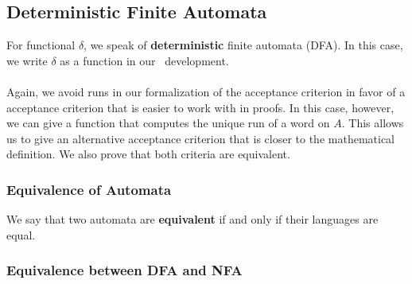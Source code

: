 
\subsection{Deterministic Finite Automata}
For functional $\delta$, we speak of \textbf{deterministic} finite automata (DFA). 
In this case, we write $\delta$ as a function in our \coq\ development. 


\paragraph{}
Again, we avoid runs in our formalization of the acceptance criterion in favor of a acceptance criterion that is easier to work with in proofs.
In this case, however, we can give a function that computes the unique run of a word on $A$.
This allows us to give an alternative acceptance criterion that is closer to the mathematical definition.
We also prove that both criteria are equivalent.





\subsubsection{Equivalence of Automata}
\begin{definition}
    We say that two automata are \textbf{equivalent} if and only if their languages are equal.
\end{definition}

\subsubsection{Equivalence between DFA and NFA}
